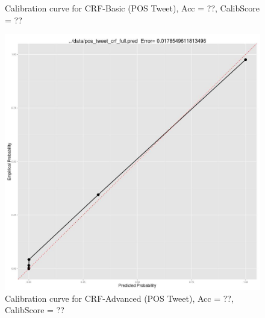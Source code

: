 \begin{figure}
  \caption{Calibration curve for CRF-Basic (POS Tweet), Acc = ??, CalibScore = ??}
  \label{fig:pos_tweet_crf_pred} 
\endminipage\hfill
{}
  \includegraphics[width=\linewidth]{pos_tweet_crf_advanced_pred.jpg}
  \caption{Calibration curve for CRF-Advanced (POS Tweet), Acc = ??, CalibScore = ??}
  \label{fig:pos_tweet_advanced_crf_pred} 
\endminipage
\end{figure}

